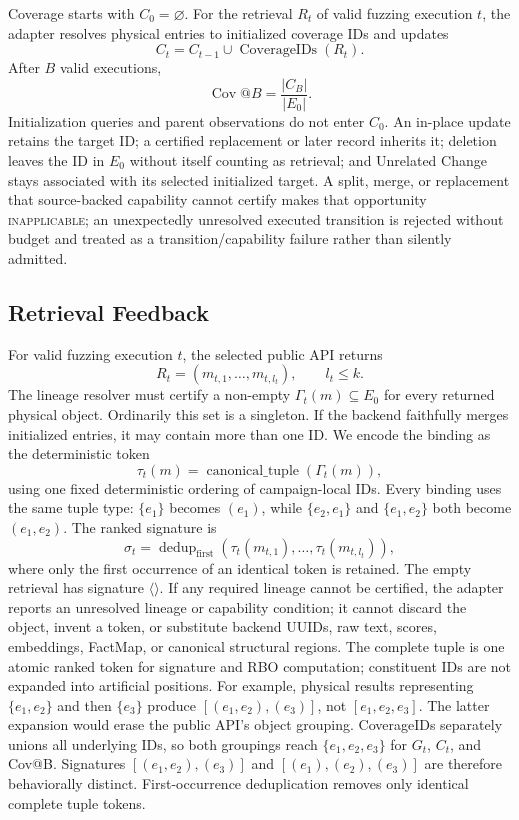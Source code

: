 Coverage starts with \(C_0=\varnothing\). For the retrieval \(R_t\) of valid
fuzzing execution \(t\), the adapter resolves physical entries to initialized
coverage IDs and updates
\[
C_t=C_{t-1}\cup\operatorname{CoverageIDs}(R_t).
\]
After \(B\) valid executions,
\[
\operatorname{Cov}@B=\frac{|C_B|}{|E_0|}.
\]
Initialization queries and parent observations do not enter \(C_0\). An
in-place update retains the target ID; a certified replacement or later record
inherits it; deletion leaves the ID in \(E_0\) without itself counting as
retrieval; and Unrelated Change stays associated with its selected initialized
target. A split, merge, or replacement that source-backed capability cannot
certify makes that opportunity \textsc{inapplicable}; an unexpectedly
unresolved executed transition is rejected without budget and treated as a
transition/capability failure rather than silently admitted.

\subsection{Retrieval Feedback}
\label{app:retrieval-feedback}

For valid fuzzing execution \(t\), the selected public API returns
\[
R_t=(m_{t,1},\ldots,m_{t,l_t}),\qquad l_t\leq k.
\]
The lineage resolver must certify a non-empty
\(\Gamma_t(m)\subseteq E_0\) for every returned physical object. Ordinarily
this set is a singleton. If the backend faithfully merges initialized entries,
it may contain more than one ID. We encode the binding as the deterministic
token
\[
\tau_t(m)=\operatorname{canonical\_tuple}(\Gamma_t(m)),
\]
using one fixed deterministic ordering of campaign-local IDs. Every binding
uses the same tuple type: \(\{e_1\}\) becomes \((e_1)\), while
\(\{e_2,e_1\}\) and \(\{e_1,e_2\}\) both become \((e_1,e_2)\). The ranked
signature is
\[
\sigma_t=\operatorname{dedup}_{\mathrm{first}}
(\tau_t(m_{t,1}),\ldots,\tau_t(m_{t,l_t})),
\]
where only the first occurrence of an identical token is retained. The empty
retrieval has signature \(\langle\rangle\). If any required lineage cannot be
certified, the adapter reports an unresolved lineage or capability condition;
it cannot discard the object, invent a token, or substitute backend UUIDs, raw
text, scores, embeddings, FactMap, or canonical structural regions.
The complete tuple is one atomic ranked token for signature and RBO
computation; constituent IDs are not expanded into artificial positions. For
example, physical results representing \(\{e_1,e_2\}\) and then \(\{e_3\}\)
produce \([(e_1,e_2),(e_3)]\), not \([e_1,e_2,e_3]\). The latter expansion
would erase the public API's object grouping. CoverageIDs separately unions all
underlying IDs, so both groupings reach \(\{e_1,e_2,e_3\}\) for \(G_t\),
\(C_t\), and Cov@B. Signatures \([(e_1,e_2),(e_3)]\) and
\([(e_1),(e_2),(e_3)]\) are therefore behaviorally distinct. First-occurrence
deduplication removes only identical complete tuple tokens.

